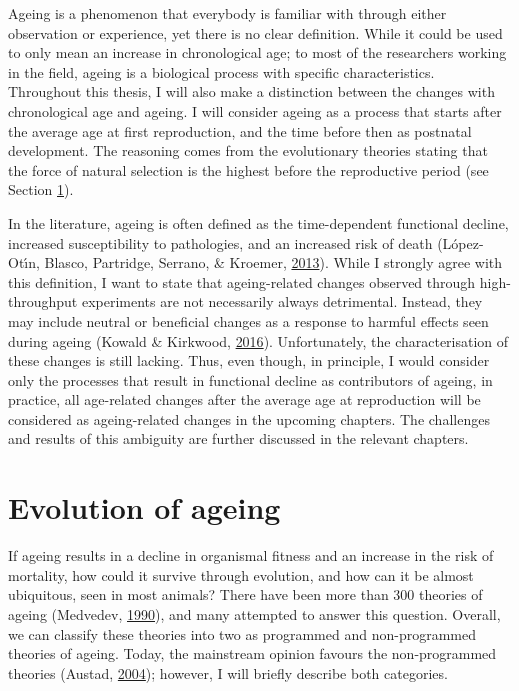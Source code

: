 \documentclass[12pt,twoside]{unicam}
\begin{document}
Ageing is a phenomenon that everybody is familiar with through either observation or experience, yet there is no clear definition. While it could be used to only mean an increase in chronological age; to most of the researchers working in the field, ageing is a biological process with specific characteristics. Throughout this thesis, I will also make a distinction between the changes with chronological age and ageing. I will consider ageing as a process that starts after the average age at first reproduction, and the time before then as postnatal development. The reasoning comes from the evolutionary theories stating that the force of natural selection is the highest before the reproductive period (see Section \ref{introEvoAgeing}).

In the literature, ageing is often defined as the time-dependent functional decline, increased susceptibility to pathologies, and an increased risk of death (López-Otı́n, Blasco, Partridge, Serrano, \& Kroemer, \protect\hyperlink{ref-Lopez-Otin2013}{2013}). While I strongly agree with this definition, I want to state that ageing-related changes observed through high-throughput experiments are not necessarily always detrimental. Instead, they may include neutral or beneficial changes as a response to harmful effects seen during ageing (Kowald \& Kirkwood, \protect\hyperlink{ref-Kowald2016}{2016}). Unfortunately, the characterisation of these changes is still lacking. Thus, even though, in principle, I would consider only the processes that result in functional decline as contributors of ageing, in practice, all age-related changes after the average age at reproduction will be considered as ageing-related changes in the upcoming chapters. The challenges and results of this ambiguity are further discussed in the relevant chapters.

\hypertarget{introEvoAgeing}{%
\section{Evolution of ageing}\label{introEvoAgeing}}

If ageing results in a decline in organismal fitness and an increase in the risk of mortality, how could it survive through evolution, and how can it be almost ubiquitous, seen in most animals? There have been more than 300 theories of ageing (Medvedev, \protect\hyperlink{ref-Medvedev1990}{1990}), and many attempted to answer this question. Overall, we can classify these theories into two as programmed and non-programmed theories of ageing. Today, the mainstream opinion favours the non-programmed theories (Austad, \protect\hyperlink{ref-Austad2004}{2004}); however, I will briefly describe both categories.
\end{document}
